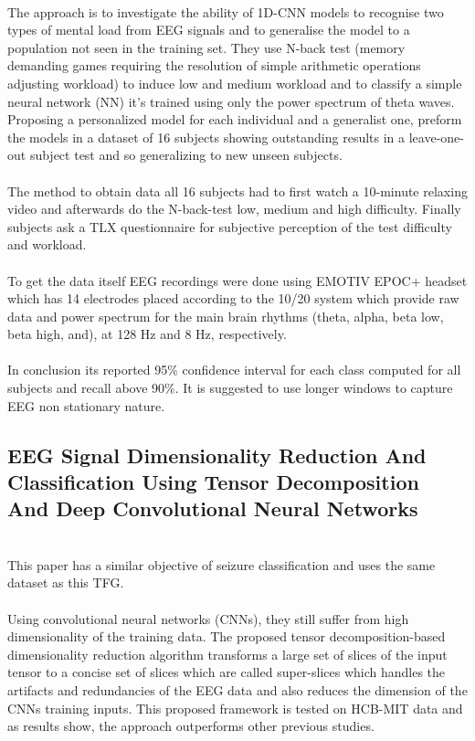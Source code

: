 \leavevmode\\
The approach is to investigate the ability of 1D-CNN models to recognise two types of mental load from EEG signals and to generalise the model to a population not seen in the training set. They use N-back test (memory demanding games requiring the resolution of simple arithmetic operations adjusting workload) to induce low and medium workload and to classify a simple neural network (NN) it’s trained using only the power spectrum of theta waves. Proposing a personalized model for each individual and a generalist one, preform the models in a dataset of 16 subjects showing outstanding results in a leave-one-out subject test and so generalizing to new unseen subjects.
\\\\
The method to obtain data all 16 subjects had to first watch a 10-minute relaxing video and afterwards do the N-back-test low, medium and high difficulty. Finally subjects ask a TLX questionnaire for subjective perception of the test difficulty and workload.
\\\\
To get the data itself EEG recordings were done using EMOTIV EPOC+ headset which has 14 electrodes placed according to the 10/20 system which provide raw data and power spectrum for the main brain rhythms (theta, alpha, beta low, beta high, and), at 128 Hz and 8 Hz, respectively. 
\\\\
In conclusion its reported 95\% confidence interval for each class computed for all subjects and recall above 90\%. It is suggested to use longer windows to capture EEG non stationary nature.
\leavevmode\\


\subsection{EEG Signal Dimensionality Reduction And Classification Using Tensor Decomposition And Deep Convolutional Neural Networks}
\leavevmode\\
This paper has a similar objective of seizure classification and uses the same dataset as this TFG.
\\\\
Using convolutional neural networks (CNNs), they still suffer from high dimensionality of the training data. The proposed tensor decomposition-based dimensionality reduction algorithm transforms a large set of slices of the input tensor to a concise set of slices which are called super-slices which handles the artifacts and redundancies of the EEG data and also reduces the dimension of the CNNs training inputs. This proposed framework is tested on HCB-MIT data and as results show, the approach outperforms other previous studies.
\\\\

